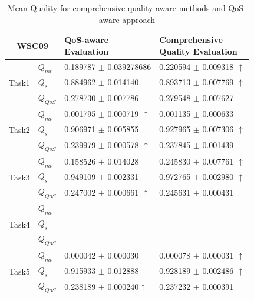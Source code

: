 \documentclass{llncs}
\begin{document}
\begin{table}[]
\footnotesize
\centering
\caption{Mean Quality for comprehensive quality-aware methods and QoS-aware approach}
\label{decisionTable}
\begin{tabular}{l|l|l|l}
\hline
\multicolumn{2}{c|}{WSC09}              & \shortstack{QoS-aware \\ Evaluation} & \shortstack{Comprehensive \\ Quality Evaluation} \\ \hline
\multirow{3}{*}{Task1}  &$Q_{mt}$   &0.189787 $\pm$ 0.039278686  &0.220594 $\pm$ 0.009318 $\uparrow$ \\ \cline{2-4} 
                        &$Q_{s}$    &0.884962 $\pm$ 0.014140   &0.893713 $\pm$ 0.007769  $\uparrow$ \\ \cline{2-4}
                        &$Q_{QoS}$  &0.278730 $\pm$ 0.007786     &0.279548 $\pm$ 0.007627                          \\ \hline
\multirow{3}{*}{Task2}  &$Q_{mt}$   &0.001795 $\pm$ 0.000719 $\uparrow$    &0.001135 $\pm$ 0.000633  \\ \cline{2-4} 
                        &$Q_{s}$    &0.906971 $\pm$ 0.005855     &0.927965 $\pm$ 0.007306 $\uparrow$   \\ \cline{2-4}
                        &$Q_{QoS}$  &0.239979 $\pm$ 0.000578 $\uparrow$     &0.237845 $\pm$ 0.001439 \\ \hline
\multirow{3}{*}{Task3}  &$Q_{mt}$   &0.158526 $\pm$ 0.014028               &  0.245830 $\pm$ 0.007761 $\uparrow$   \\ \cline{2-4} 
                        &$Q_{s}$    & 0.949109 $\pm$ 0.002331           &   0.972765 $\pm$ 0.002980 $\uparrow$           \\ \cline{2-4}
                        &$Q_{QoS}$  &  0.247002 $\pm$ 0.000661 $\uparrow$             &  0.245631 $\pm$ 0.000431            \\ \hline
\multirow{3}{*}{Task4}  &$Q_{mt}$   &              &                 \\ \cline{2-4} 
                        &$Q_{s}$    &               &                   \\ \cline{2-4}
                        &$Q_{QoS}$  &               &                     \\ \hline
\multirow{3}{*}{Task5}  &$Q_{mt}$   &  0.000042 $\pm$ 0.000030     &  0.000078 $\pm$ 0.000031 $\uparrow$           \\ \cline{2-4} 
                        &$Q_{s}$    &  0.915933 $\pm$ 0.012888      &  0.928189 $\pm$ 0.002486 $\uparrow$                 \\ \cline{2-4}
                        &$Q_{QoS}$  & 0.238189 $\pm$ 0.000240$\uparrow$      &  0.237232 $\pm$  0.000391  \\ \hline                                                   
\end{tabular}
\end{table}
\end{document}
